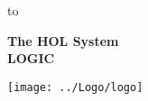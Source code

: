

\begin{titlepage}
\null\vskip-47pt
\hbox to 

\setcounter{page}{1}                      %

\vspace*{60mm}


\begin{center}
 {\Huge\bf The HOL System}\\[0.4cm]
{\LARGE\bf LOGIC}\\[2.5cm]
\end{center}

\begin{center}
\texttt{[image: ../Logo/logo]}
\end{center}

\vfill
\end{titlepage}

\thispagestyle{empty}
\mbox{}
\newpage

